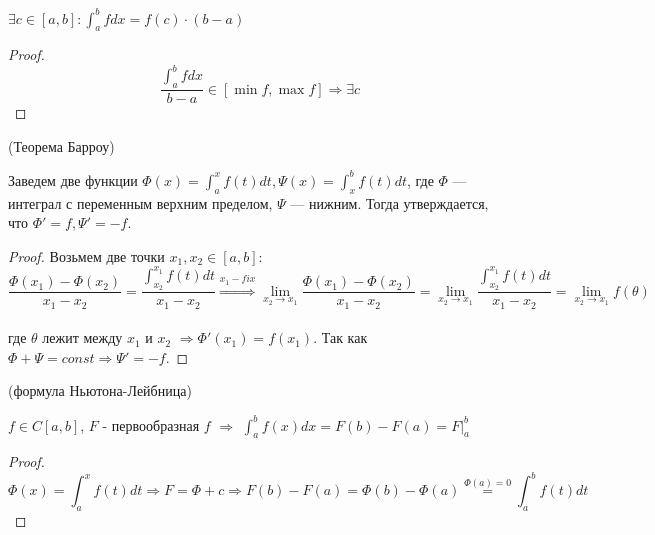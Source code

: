 \begin{properties}
    $\exists c \in [a, b] : \int_a^b f dx = f(c) \cdot (b-a)$
    \begin{proof}
    \[\frac {\int_a^b f dx} {b - a} \in [\min f, \max f] \Rightarrow \exists c\]
    \end{proof}

\newpage
    \item(Теорема Барроу) 
    
    Заведем две функции $\Phi(x) = \int_a^x f(t) dt, \Psi(x) = \int_x^b f(t) dt$, 
    где $\Phi$ --- интеграл с переменным верхним пределом, $\Psi$ --- нижним.
    Тогда утверждается, что $\Phi' = f, \Psi' = -f$.
    \begin{proof}
        Возьмем две точки $x_1, x_2 \in [a, b]$:
        \[\frac {\Phi(x_1) - \Phi(x_2)} {x_1 - x_2}
        = \frac {\int_{x_2}^{x_1} f(t) dt} {x_1 - x_2}  
        \stackrel{x_1- fix}{\Rightarrow} \lim_{x_2 \to x_1} \frac {\Phi(x_1) - \Phi(x_2)} {x_1 - x_2}
        = \lim_{x_2 \to x_1} \frac {\int_{x_2}^{x_1} f(t) dt} {x_1 - x_2}
        = \lim_{x_2 \to x_1} f(\theta)\] \\
        где $\theta$ лежит между $x_1$ и $x_2$ 
        $\Rightarrow \Phi'(x_1) = f(x_1)$. 
        Так как $\Phi + \Psi = const \Rightarrow \Psi' = -f$.
    \end{proof}

    \item(формула Ньютона-Лейбница) 
    
    $f \in C[a, b]$, $F$ - первообразная $f$ $\Rightarrow$ 
    $\int_a^b f(x) dx = F(b) - F(a) = F|_a^b$
    \begin{proof}
        \[ \Phi(x) = \int_a^x f(t) dt \Rightarrow F = \Phi + c \Rightarrow F(b) - F(a)
        = \Phi(b) - \Phi(a) \stackrel{\Phi(a)=0}{=} \int_a^b f(t) dt \]
    \end{proof}


\end{properties}
